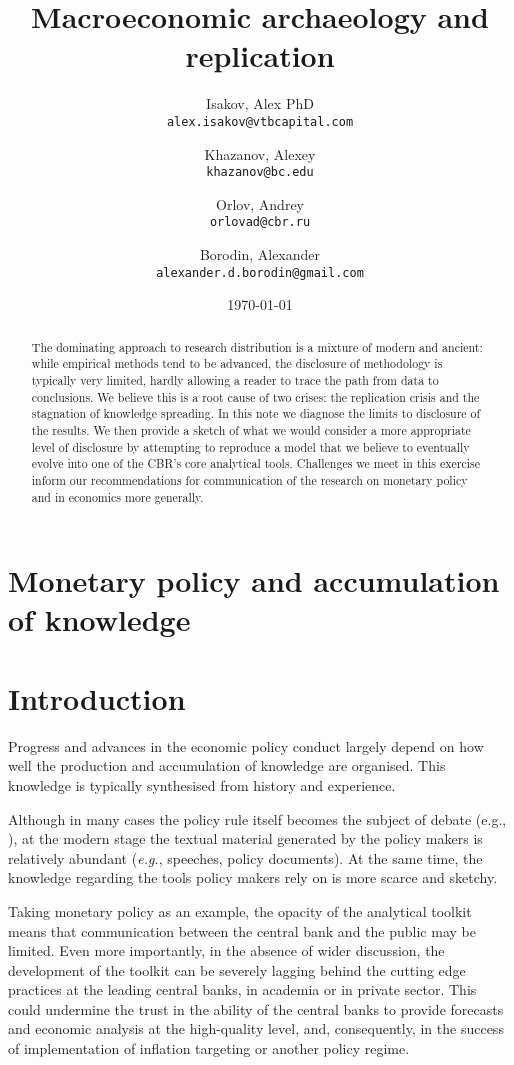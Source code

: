 \documentclass[12pt]{article}
\title{Macroeconomic archaeology and replication}
\author{
	Isakov, Alex PhD \\
	\texttt{alex.isakov@vtbcapital.com}
	\and
	Khazanov, Alexey \\
	\texttt{khazanov@bc.edu}
	\and
	Orlov, Andrey \\
	\texttt{orlovad@cbr.ru}
	\and 
	Borodin, Alexander \\
	\texttt{alexander.d.borodin@gmail.com}
}
\date{\today}
\begin{document}
	
\maketitle
	
\begin{abstract}

The dominating approach to research distribution is a mixture of modern and ancient: while empirical methods tend to be advanced, the disclosure of methodology is typically very limited, hardly allowing a reader to trace the path from data to conclusions. We believe this is a root cause of two crises: the replication crisis and the stagnation of knowledge spreading. In this note we diagnose the limits to disclosure of the results. We then provide a sketch of what we would consider a more appropriate level of disclosure by attempting to reproduce a model that we believe to eventually evolve into one of the CBR's core analytical tools. Challenges we meet in this exercise inform our recommendations for communication of the research on monetary policy and in economics more generally. 
\end{abstract}

\newpage 
\tableofcontents
\newpage 
\section{Monetary policy and accumulation of knowledge}

\section{Introduction}

Progress and advances in the economic policy conduct largely depend on how well the production and accumulation of knowledge are organised. This knowledge is typically synthesised from history and experience. 

Although in many cases the policy rule itself becomes the subject of debate (e.g., \cite{belongia2016evolution}), at the modern stage the textual material generated by the policy makers is relatively abundant ({\it e.g.}, speeches, policy documents). At the same time, the knowledge regarding the tools policy makers rely on is more scarce and sketchy. 

Taking monetary policy as an example, the opacity of the analytical toolkit means that communication between the central bank and the public may be limited. Even more importantly, in the absence of wider discussion, the development of the toolkit can be severely lagging behind the cutting edge practices at the leading central banks, in academia or in private sector. This could undermine the trust in the ability of the central banks to provide forecasts and economic analysis at the high-quality level, and, consequently, in the success of implementation of inflation targeting or another policy regime. 
\end{document}
